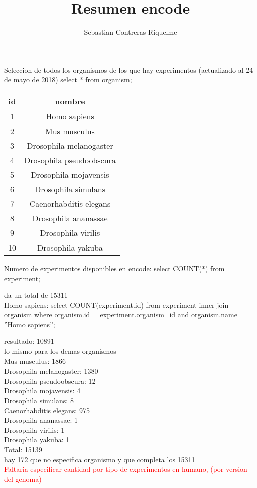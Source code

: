 \documentclass[10pt,a4paper]{article}
\author{Sebastian Contreras-Riquelme}
\title{Resumen encode}
\begin{document}
Seleccion de todos los organismos de los que hay experimentos (actualizado al 24 de mayo de 2018)
 select * from organism;\\

\begin{tabular}{|c|c|}
\hline 
id & nombre \\ 
\hline 
1 & Homo sapiens \\ 
\hline 
2 & Mus musculus \\ 
\hline 
3 & Drosophila melanogaster \\ 
\hline 
4 & Drosophila pseudoobscura \\ 
\hline 
5 & Drosophila mojavensis \\ 
\hline 
6 & Drosophila simulans \\ 
\hline 
7 & Caenorhabditis elegans \\ 
\hline 
8 & Drosophila ananassae \\ 
\hline 
9 & Drosophila virilis \\ 
\hline 
10 & Drosophila yakuba \\ 
\hline 
\end{tabular} 
 
 
Numero de experimentos disponibles en encode: select COUNT(*) from experiment; 

da un total de  15311 \\


Homo sapiens: select COUNT(experiment.id) from experiment inner join organism where organism.id = experiment.organism\_id and organism.name = ''Homo sapiens'';

resultado: 10891\\

lo mismo para los demas organismos\\
Mus musculus: 1866\\
Drosophila melanogaster: 1380\\
Drosophila pseudoobscura: 12\\
Drosophila mojavensis: 4\\
Drosophila simulans: 8\\
Caenorhabditis elegans: 975\\
Drosophila ananassae: 1\\
Drosophila virilis: 1\\
Drosophila yakuba: 1\\

Total:  15139\\
hay 172 que no especifica organismo y que completa los 15311\\


\textcolor{red}{Faltaria especificar cantidad por tipo de experimentos en humano, (por version del genoma)}
\end{document}

